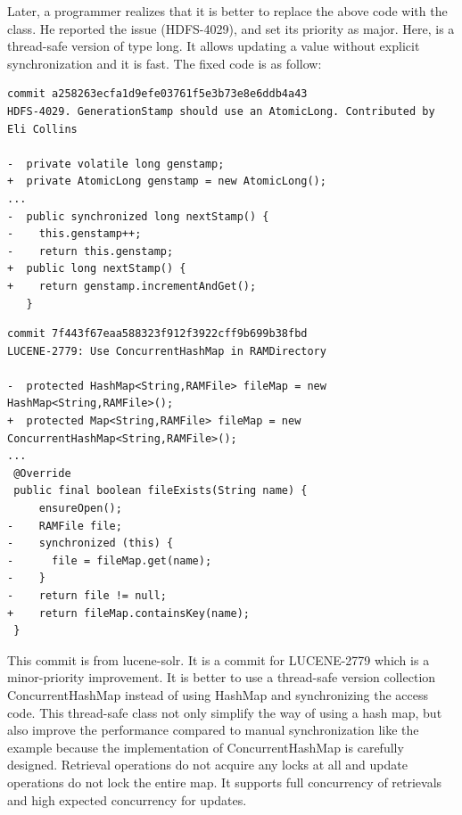 Later, a programmer realizes that it is better to replace the above code with the  class. He reported the issue (HDFS-4029), and set its priority as major. Here,  is a thread-safe version of type long. It allows updating a  value without explicit synchronization and it is fast. The fixed code is as follow:


\begin{lstlisting}
commit a258263ecfa1d9efe03761f5e3b73e8e6ddb4a43
HDFS-4029. GenerationStamp should use an AtomicLong. Contributed by Eli Collins

-  private volatile long genstamp;
+  private AtomicLong genstamp = new AtomicLong();
...
-  public synchronized long nextStamp() {
-    this.genstamp++;
-    return this.genstamp;
+  public long nextStamp() {
+    return genstamp.incrementAndGet();
   }
\end{lstlisting}



\begin{lstlisting}
commit 7f443f67eaa588323f912f3922cff9b699b38fbd
LUCENE-2779: Use ConcurrentHashMap in RAMDirectory

-  protected HashMap<String,RAMFile> fileMap = new HashMap<String,RAMFile>();
+  protected Map<String,RAMFile> fileMap = new ConcurrentHashMap<String,RAMFile>();
...
 @Override
 public final boolean fileExists(String name) {
     ensureOpen();
-    RAMFile file;
-    synchronized (this) {
-      file = fileMap.get(name);
-    }
-    return file != null;
+    return fileMap.containsKey(name);
 }
\end{lstlisting}

This commit is from lucene-solr. It is a commit for LUCENE-2779 which is a minor-priority improvement. It is better to use a thread-safe version collection ConcurrentHashMap instead of using HashMap and synchronizing the access code. This thread-safe class not only simplify the way of using a hash map, but also improve the performance compared to manual synchronization like the example because the implementation of ConcurrentHashMap is carefully designed. Retrieval operations do not acquire any locks at all and update operations do not lock the entire map. It supports full concurrency of retrievals and high expected concurrency for updates.

%
%
%
%
%
%

